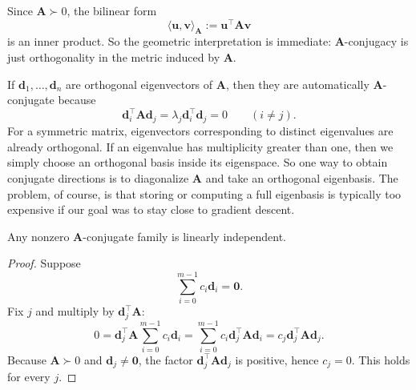 Since $\mathbf{A}\succ 0$, the bilinear form
\[
  \langle \mathbf{u},\mathbf{v}\rangle_{\mathbf{A}}
  :=\mathbf{u}^{\top}\mathbf{A}\mathbf{v}
\]
is an inner product. So the geometric interpretation is immediate:
$\mathbf{A}$-conjugacy is just orthogonality in the metric induced by
$\mathbf{A}$.

\begin{example}
If $\mathbf{d}_1,\ldots,\mathbf{d}_n$ are orthogonal eigenvectors of
$\mathbf{A}$, then they are automatically $\mathbf{A}$-conjugate because
\[
  \mathbf{d}_i^{\top}\mathbf{A}\mathbf{d}_j
  =\lambda_j \mathbf{d}_i^{\top}\mathbf{d}_j
  =0
  \qquad (i\neq j).
\]
For a symmetric matrix, eigenvectors corresponding to distinct eigenvalues are
already orthogonal. If an eigenvalue has multiplicity greater than one, then
we simply choose an orthogonal basis inside its eigenspace. So one way to
obtain conjugate directions is to diagonalize $\mathbf{A}$ and take an
orthogonal eigenbasis. The problem, of course, is that storing or computing a
full eigenbasis is typically too expensive if our goal was to stay close to
gradient descent.
\end{example}

\begin{claim}
\label{clm:ch5-conjugate-li}
Any nonzero $\mathbf{A}$-conjugate family is linearly independent.
\end{claim}
\begin{proof}
Suppose
\[
  \sum_{i=0}^{m-1} c_i \mathbf{d}_i=\mathbf{0}.
\]
Fix $j$ and multiply by $\mathbf{d}_j^{\top}\mathbf{A}$:
\[
  0
  =\mathbf{d}_j^{\top}\mathbf{A}\sum_{i=0}^{m-1} c_i \mathbf{d}_i
  =\sum_{i=0}^{m-1} c_i \mathbf{d}_j^{\top}\mathbf{A}\mathbf{d}_i
  =c_j \mathbf{d}_j^{\top}\mathbf{A}\mathbf{d}_j.
\]
Because $\mathbf{A}\succ 0$ and $\mathbf{d}_j\neq \mathbf{0}$, the factor
$\mathbf{d}_j^{\top}\mathbf{A}\mathbf{d}_j$ is positive, hence $c_j=0$. This
holds for every $j$.
\end{proof}

